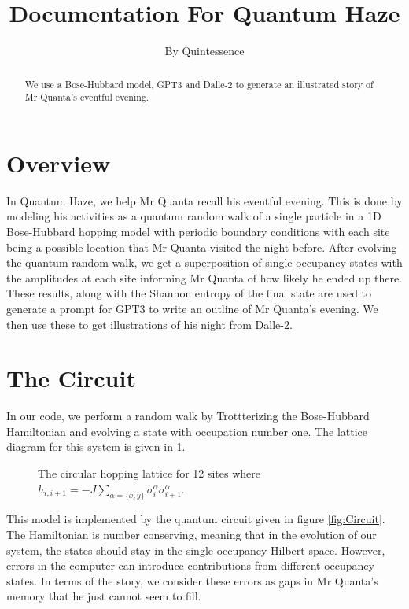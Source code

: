 \documentclass[11pt]{article}
\title{Documentation For Quantum Haze}
\author{By Quintessence}
\begin{document}
  \maketitle
  \begin{abstract}
    We use a Bose-Hubbard model, GPT3 and Dalle-2 to generate an illustrated story of Mr Quanta's eventful evening. 
  \end{abstract}
  \tableofcontents
  \section{Overview}
    In Quantum Haze, we help Mr Quanta recall his eventful evening. This is done by modeling his activities as a quantum random walk of a single particle in a 1D Bose-Hubbard hopping model with periodic boundary conditions with each site being a possible location that Mr Quanta visited the night before. After evolving the quantum random walk, we get a superposition of single occupancy states with the amplitudes at each site informing Mr Quanta of how likely he ended up there. These results, along with the  Shannon entropy of the final state are used to generate a prompt for GPT3 to write an outline of Mr Quanta's evening. We then use these to get illustrations of his night from Dalle-2. 
  \section{The Circuit}
    In our code, we  perform a random walk by Trottterizing the Bose-Hubbard Hamiltonian and evolving a state with occupation number one. The lattice diagram for this system is given in \ref{fig:Lattice}.
    \begin{figure}[h]
      \centering
      \caption{The circular hopping lattice for 12 sites where $h_{i,i+1} = -J\sum\limits_{\alpha=\{x,y\}}\sigma_i^\alpha\sigma^\alpha_{i+1}$.}\label{fig:Lattice}
    \end{figure}

    This model is implemented by the quantum circuit given in figure \ref{fig:Circuit}. The Hamiltonian is number conserving, meaning that in the evolution of our system, the states should stay in the single occupancy Hilbert space. However, errors in the computer can introduce contributions from different occupancy states. In terms of the story, we consider these errors as gaps in Mr Quanta's memory that he just cannot seem to fill. 
\end{document}
